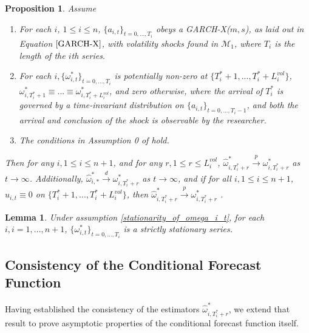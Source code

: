 \documentclass{uiucthesis2021}
\def\mc#1{\mathcal{#1}} %
\def\mc#1{\mathcal{#1}}
\newtheorem{lem}{Lemma}
\newtheorem{prop}{Proposition}
\theoremstyle{definition}
\begin{document}
\begin{prop}\label{omega_consistency}
Assume
\begin{enumerate}
  \item For each $i$, $1\leq i \leq n$, $\{a_{i,t}\}_{t=0,...,T_i}$ obeys a GARCH-X($m,s$), as laid out in Equation $\eqref{GARCH-X}$, with volatility shocks found in $\mc{M}_{1}$, where $T_i$ is the length of the $i$th series.
  \item For each $i, \{\omega_{i,t}^{*}\}_{t=0,...,T_i}$ is potentially non-zero at $\{T^{*}_{i}+1,... ,T^{*}_{i}+L_{i}^{vol}\}$, $\omega_{i,T_{i}^{*}+1}^{*}\equiv...\equiv\omega_{i,T_{i}^{*}+L_{i}^{vol}}^{*}$, and zero otherwise, where the arrival of $T_{i}^{*}$ is governed by a time-invariant distribution on $\{a_{i,t}\}_{t=0,...,T_i-1}$, and both the arrival and conclusion of the shock is observable by the researcher. \label{stationarity_of_omega_i_t}
  \item The conditions in Assumption 0 of \cite[][]{han2014asymptotic} hold.
\end{enumerate}

Then for any $i, 1\leq i \leq n+1$, and for any $r, 1\leq r \leq L_{i}^{vol}$, $\hat\omega_{i,T_{i}^{*}+r}^{*} \overset{p}{\longrightarrow} \omega_{i,T_{i}^{*}+r}^{*}$ as $t\rightarrow\infty$.  Additionally, $\hat\omega_{i,*}^{*} \overset{d}{\longrightarrow} \omega_{i,T_{i}^{*}+r}^{*}$ as $t\rightarrow\infty$, and if for all $i, 1 \leq i \leq n+ 1$, $u_{i,t} \equiv 0$ on $\{T^{*}_{i}+1,... ,T^{*}_{i}+L_{i}^{vol}\}$, then $\hat\omega_{i,T_{i}^{*}+r}^{*} \overset{p}{\longrightarrow} \omega_{i,T_{i}^{*}+r}^{*}$ .
\end{prop}

\begin{lem}\label{lemma_ref}
  Under assumption \ref{stationarity_of_omega_i_t}, for each $i, i=1,...,n+1$,  $\{\omega_{i,t}^{*}\}_{t=0,...,T_i}$ is a strictly stationary series.
\end{lem}


\subsection{Consistency of the Conditional Forecast Function}

Having established the consistency of the estimators $\hat\omega^{*}_{i,T_{i}^{*}+r}$, we extend that result to prove asymptotic properties of the conditional forecast function itself.
\end{document}
